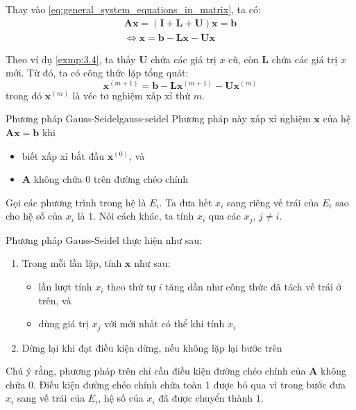 \documentclass[../../Lectures]{subfiles}
\begin{document}
Thay vào \eqref{eq:general_system_equations_in_matrix}, ta có:
\begin{gather*}
    \bm{Ax} = (\bm{I} + \bm{L} + \bm{U}) \bm{x} = \bm{b} \\
    \iff \bm{x} = \bm{b} -\bm{Lx} - \bm{Ux}
\end{gather*}

Theo ví dụ \ref{exmp:3.4}, ta thấy \(\bm{U}\) chứa các giá trị \(x\) cũ, còn
\(\bm{L}\) chứa các giá trị \(x\) mới. Từ đó, ta có công thức lặp tổng quát:
\begin{equation}\label{eq:gauss-seldel_sequence_function}
    \bm{x}^{(m + 1)} = \bm{b} - \bm{L} \bm{x}^{(m + 1)} - \bm{U} \bm{x}^{(m)}
\end{equation}
trong đó \(\bm{x}^{(m)}\) là véc tơ nghiệm xấp xỉ thứ \(m\).

\begin{cmethod}{Phương pháp Gauss-Seidel}{gauss-seidel}
    Phương pháp này xấp xỉ nghiệm \(\bm{x}\) của hệ \(\bm{Ax} = \bm{b}\) khi
    \begin{itemize}
        \item biết xấp xỉ bắt đầu \(\bm{x}^{(0)}\), và
        \item \(\bm{A}\) không chứa \(0\) trên đường chéo chính
    \end{itemize}

    Gọi các phương trình trong hệ là \(E_i\). Ta đưa hết \(x_i\) sang riêng vế
    trái của \(E_i\) sao cho hệ số của \(x_i\) là \(1\). Nói cách khác, ta tính
    \(x_i\) qua các \(x_j\), \(j \neq i\).

    Phương pháp Gauss-Seidel thực hiện như sau:
    \begin{enumerate}
        \item Trong mỗi lần lặp, tính \(\bm{x}\) như sau:
            \begin{itemize}
                \item lần lượt tính \(x_i\) theo thứ tự \(i\) tăng dần như công
                    thức đã tách vế trái ở trên, và
                \item dùng giá trị \(x_j\) với mới nhất có thể khi tính \(x_i\)
            \end{itemize}
        \item Dừng lại khi đạt điều kiện dừng, nếu không lặp lại bước trên
    \end{enumerate}
\end{cmethod}

Chú ý rằng, phương pháp trên chỉ cần điều kiện đường chéo chính của \(\bm{A}\)
không chứa \(0\). Điều kiện đường chéo chính chứa toàn \(1\) được bỏ qua vì
trong bước đưa \(x_i\) sang vế trái của \(E_i\), hệ số của \(x_i\) đã được
chuyển thành \(1\).
\end{document}
